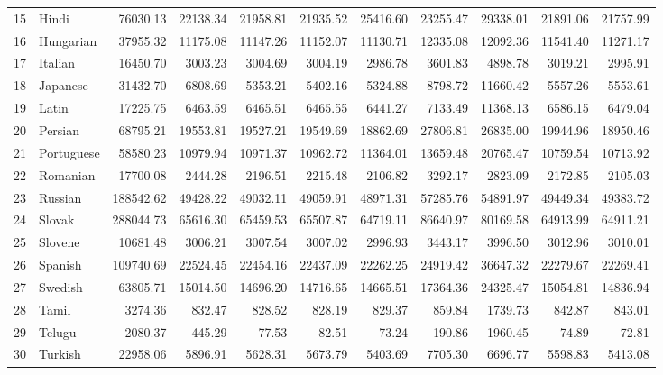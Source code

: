 \documentclass[a4paper]{article}
\begin{document}
\begin{table}
\begin{tabular}{rlrrrrrrrrr}
  15 & Hindi & 76030.13 & 22138.34 & 21958.81 & 21935.52 & 25416.60 & 23255.47 & 29338.01 & 21891.06 & 21757.99 \\ 
  16 & Hungarian & 37955.32 & 11175.08 & 11147.26 & 11152.07 & 11130.71 & 12335.08 & 12092.36 & 11541.40 & 11271.17 \\ 
  17 & Italian & 16450.70 & 3003.23 & 3004.69 & 3004.19 & 2986.78 & 3601.83 & 4898.78 & 3019.21 & 2995.91 \\ 
  18 & Japanese & 31432.70 & 6808.69 & 5353.21 & 5402.16 & 5324.88 & 8798.72 & 11660.42 & 5557.26 & 5553.61 \\ 
  19 & Latin & 17225.75 & 6463.59 & 6465.51 & 6465.55 & 6441.27 & 7133.49 & 11368.13 & 6586.15 & 6479.04 \\ 
  20 & Persian & 68795.21 & 19553.81 & 19527.21 & 19549.69 & 18862.69 & 27806.81 & 26835.00 & 19944.96 & 18950.46 \\ 
  21 & Portuguese & 58580.23 & 10979.94 & 10971.37 & 10962.72 & 11364.01 & 13659.48 & 20765.47 & 10759.54 & 10713.92 \\ 
  22 & Romanian & 17700.08 & 2444.28 & 2196.51 & 2215.48 & 2106.82 & 3292.17 & 2823.09 & 2172.85 & 2105.03 \\ 
  23 & Russian & 188542.62 & 49428.22 & 49032.11 & 49059.91 & 48971.31 & 57285.76 & 54891.97 & 49449.34 & 49383.72 \\ 
  24 & Slovak & 288044.73 & 65616.30 & 65459.53 & 65507.87 & 64719.11 & 86640.97 & 80169.58 & 64913.99 & 64911.21 \\ 
  25 & Slovene & 10681.48 & 3006.21 & 3007.54 & 3007.02 & 2996.93 & 3443.17 & 3996.50 & 3012.96 & 3010.01 \\ 
  26 & Spanish & 109740.69 & 22524.45 & 22454.16 & 22437.09 & 22262.25 & 24919.42 & 36647.32 & 22279.67 & 22269.41 \\ 
  27 & Swedish & 63805.71 & 15014.50 & 14696.20 & 14716.65 & 14665.51 & 17364.36 & 24325.47 & 15054.81 & 14836.94 \\ 
  28 & Tamil & 3274.36 & 832.47 & 828.52 & 828.19 & 829.37 & 859.84 & 1739.73 & 842.87 & 843.01 \\ 
  29 & Telugu & 2080.37 & 445.29 & 77.53 & 82.51 & 73.24 & 190.86 & 1960.45 & 74.89 & 72.81 \\ 
  30 & Turkish & 22958.06 & 5896.91 & 5628.31 & 5673.79 & 5403.69 & 7705.30 & 6696.77 & 5598.83 & 5413.08 \\ 
   \hline
   
\end{tabular}
\end{table}
\pagestyle{plain}
\end{document}
